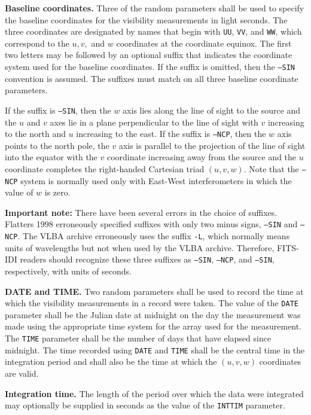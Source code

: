 \documentclass[twoside]{article}
\newcommand{\Hi}[1]{\textcolor{hicol}{#1}}
\begin{document}
{\bf Baseline coordinates.}  Three of the random parameters shall be
used to specify the baseline coordinates for the visibility
measurements in light seconds.  The three coordinates are designated
by names that begin with {\tt UU}, {\tt VV}, and {\tt WW}, which
correspond to the $u, v,$ and $w$ coordinates \Hi{at the coordinate
equinox}.  The first two letters may be followed by an optional suffix
that indicates the coordinate system used for the baseline
coordinates.  If the suffix is omitted, then the {\tt ---SIN}
convention is assumed.  The suffixes must match on all three baseline
coordinate parameters.

If the suffix is {\tt ---SIN}, then the $w$ axis lies along the line
of sight to the source and the $u$ and $v$ axes lie in a plane
perpendicular to the line of sight with $v$ increasing to the north
and $u$ increasing to the east.  If the suffix is {\tt ---NCP}, then
the $w$ axis points to the north pole, the $v$ axis is parallel to the
projection of the line of sight into the equator with the $v$
coordinate increasing away from the source and the $u$ coordinate
completes the right-handed Cartesian triad $(u,v,w)$.  \Hi{Note that
  the {\tt ---NCP} system is normally used only with East-West
  interferometers in which the value of $w$ is zero.}

{\bf Important note:} \Hi{There have been several errors in the choice
  of suffixes.  Flatters 1998 \cite{F98} erroneously specified suffixes
  with only two minus signs, {\tt --SIN} and {\tt --NCP}\@.  The VLBA
  archive erroneously uses the suffix {\tt -L}, which normally
  means units of wavelengths but not when used by the VLBA archive.
  Therefore, FITS-IDI readers should recognize these three suffixes as
  {\tt ---SIN}, {\tt ---NCP}, and {\tt ---SIN}, respectively, with
  units of seconds.}

{\bf DATE and TIME\@.} Two random parameters shall be used to record
the time at which the visibility measurements in a record were taken.
The value of the {\tt DATE} parameter shall be the Julian date at
midnight on the day the measurement was made using the appropriate
time system for the array used for the measurement.  The {\tt TIME}
parameter shall be the number of days that have elapsed since
midnight.  The time recorded using {\tt DATE} and {\tt TIME} shall be
the central time in the integration period and shall also be the time
at which the $(u,v,w)$ coordinates are valid.

{\bf Integration time.} The length of the period over which the data
were integrated may optionally be supplied in seconds as the value of
the {\tt INTTIM} parameter.
\end{document}

